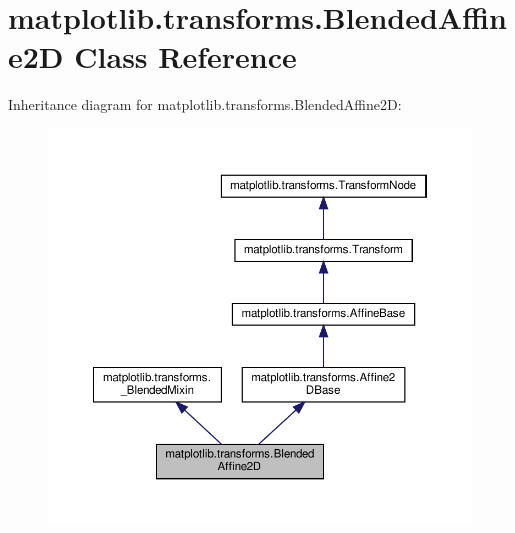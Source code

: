 \hypertarget{classmatplotlib_1_1transforms_1_1BlendedAffine2D}{}\section{matplotlib.\+transforms.\+Blended\+Affine2D Class Reference}
\label{classmatplotlib_1_1transforms_1_1BlendedAffine2D}


Inheritance diagram for matplotlib.\+transforms.\+Blended\+Affine2D\+:
\nopagebreak
\begin{figure}[H]
\begin{center}
\leavevmode
\includegraphics[width=350pt]{classmatplotlib_1_1transforms_1_1BlendedAffine2D__inherit__graph}
\end{center}
\end{figure}



